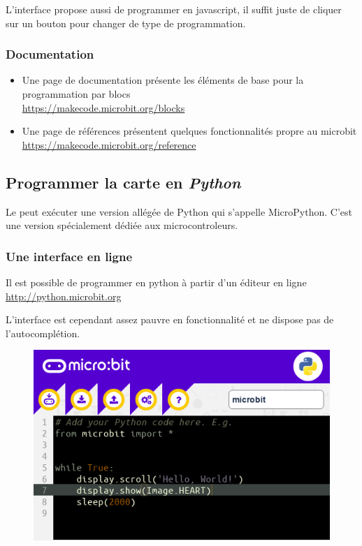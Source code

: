 \begin{remarque}
    L’interface propose aussi de programmer en javascript, il suffit juste de cliquer sur un bouton pour changer de type de programmation.
\end{remarque}

\subsubsection{Documentation}

\begin{itemize}
    \item Une page de documentation présente les éléments de base pour la programmation par blocs\\
        \url{https://makecode.microbit.org/blocks}
    \item Une page de références présentent quelques fonctionnalités propre au microbit\\
        \url{https://makecode.microbit.org/reference}
\end{itemize}


\subsection{Programmer la carte \mb en \emph{Python}}

Le \mb peut exécuter une version allégée de Python qui s’appelle MicroPython. C’est une version spécialement dédiée aux microcontroleurs.

\subsubsection{Une interface en ligne}

Il est possible de programmer en python à partir d’un éditeur en ligne \url{http://python.microbit.org}

L’interface est cependant assez pauvre en fonctionnalité et ne dispose pas de l’autocomplétion.

\begin{figure}[h]
    \centering
    \includegraphics[width=0.65\linewidth]{res/mb-prog2.png}
\end{figure}

